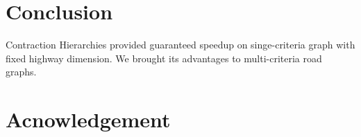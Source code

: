 

\section{Conclusion}
Contraction Hierarchies provided guaranteed speedup on singe-criteria graph
with fixed highway dimension. We brought its advantages to multi-criteria 
road graphs.


\section*{Acnowledgement}







\newpage


